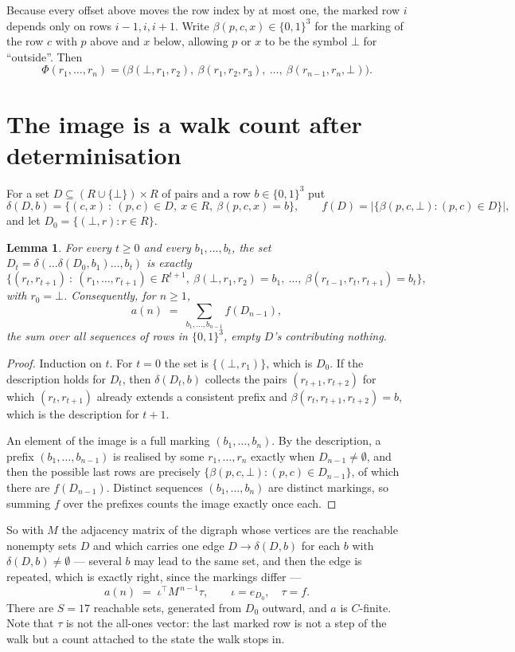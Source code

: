 \documentclass[11pt,a4paper]{article}
\theoremstyle{plain}
\newtheorem{lemma}[theorem]{Lemma}
\theoremstyle{definition}
\begin{document}
Because every offset above moves the row index by at most one, the marked row $i$ depends only
on rows $i-1,i,i+1$. Write $\beta(p,c,x)\in\{0,1\}^{3}$ for the marking of the row $c$
with $p$ above and $x$ below, allowing $p$ or $x$ to be the symbol $\bot$ for ``outside''.
Then
\[
\Phi(r_1,\dots,r_n)=\bigl(\beta(\bot,r_1,r_2),\ \beta(r_1,r_2,r_3),\ \dots,\
\beta(r_{n-1},r_n,\bot)\bigr).
\]

\section{The image is a walk count after determinisation}

For a set $D\subseteq(R\cup\{\bot\})\times R$ of pairs and a row $b\in\{0,1\}^{3}$ put
\[
\delta(D,b)=\{(c,x)\ :\ (p,c)\in D,\ x\in R,\ \beta(p,c,x)=b\},\qquad
f(D)=\bigl|\{\beta(p,c,\bot):(p,c)\in D\}\bigr| ,
\]
and let $D_0=\{(\bot,r):r\in R\}$.

\begin{lemma}\label{lem:det}
For every $t\ge0$ and every $b_1,\dots,b_t$, the set
$D_t=\delta(\dots\delta(D_0,b_1)\dots,b_t)$ is exactly
\[
\{(r_t,r_{t+1})\ :\ (r_1,\dots,r_{t+1})\in R^{t+1},\ \beta(\bot,r_1,r_2)=b_1,\ \dots,\
\beta(r_{t-1},r_t,r_{t+1})=b_t\} ,
\]
with $r_0=\bot$. Consequently, for $n\ge1$,
\[
a(n)\;=\;\sum_{b_1,\dots,b_{n-1}}f(D_{n-1}),
\]
the sum over all sequences of rows in $\{0,1\}^{3}$, empty $D$'s contributing nothing.
\end{lemma}

\begin{proof}
Induction on $t$. For $t=0$ the set is $\{(\bot,r_1)\}$, which is $D_0$. If the description
holds for $D_t$, then $\delta(D_t,b)$ collects the pairs $(r_{t+1},r_{t+2})$ for which
$(r_t,r_{t+1})$ already extends a consistent prefix and
$\beta(r_t,r_{t+1},r_{t+2})=b$, which is the description for $t+1$.

An element of the image is a full marking $(b_1,\dots,b_n)$. By the description, a prefix
$(b_1,\dots,b_{n-1})$ is realised by some $r_1,\dots,r_n$ exactly when $D_{n-1}\neq
\emptyset$, and then the possible last rows are precisely
$\{\beta(p,c,\bot):(p,c)\in D_{n-1}\}$, of which there are $f(D_{n-1})$. Distinct
sequences $(b_1,\dots,b_n)$ are distinct markings, so summing $f$ over the prefixes counts the
image exactly once each.
\end{proof}

So with $M$ the adjacency matrix of the digraph whose vertices are the reachable nonempty sets
$D$ and which carries one edge $D\to\delta(D,b)$ for each $b$ with $\delta(D,b)\neq\emptyset$
--- several $b$ may lead to the same set, and then the edge is repeated, which is exactly
right, since the markings differ ---
\[
a(n)\;=\;\iota^{\!\top}M^{\,n-1}\tau,\qquad \iota=e_{D_0},\quad \tau=f .
\]
There are $S=17$ reachable sets, generated from $D_0$ outward, and $a$ is $C$-finite. Note
that $\tau$ is not the all-ones vector: the last marked row is not a step of the walk but a
count attached to the state the walk stops in.
\end{document}
